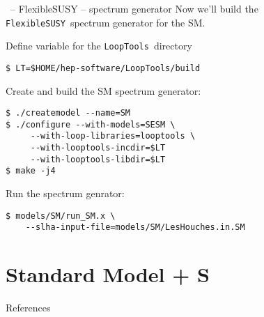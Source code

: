 \documentclass[11pt]{beamer}
\newcommand{\FlexibleSUSY}{\texttt{FlexibleSUSY}}
\newcommand{\LoopTools}{\texttt{LoopTools}}
\begin{document}
\begin{frame}[fragile]{\insertsection\ -- FlexibleSUSY -- spectrum generator}
  Now we'll build the \FlexibleSUSY\ spectrum generator for the SM.

  \bigskip

  Define variable for the \LoopTools\ directory
  \begin{lstlisting}
$ LT=$HOME/hep-software/LoopTools/build\end{lstlisting}%
  Create and build the SM spectrum generator:
  \begin{lstlisting}
$ ./createmodel --name=SM
$ ./configure --with-models=SESM \
     --with-loop-libraries=looptools \
     --with-looptools-incdir=$LT
     --with-looptools-libdir=$LT
$ make -j4\end{lstlisting}%
  Run the spectrum genrator:
  \begin{lstlisting}
$ models/SM/run_SM.x \
    --slha-input-file=models/SM/LesHouches.in.SM\end{lstlisting}%
\end{frame}


\section{Standard Model + S}

\begin{frame}{\insertsection}
\end{frame}


\begin{frame}[allowframebreaks]{References}
  \printbibliography
\end{frame}
\end{document}
